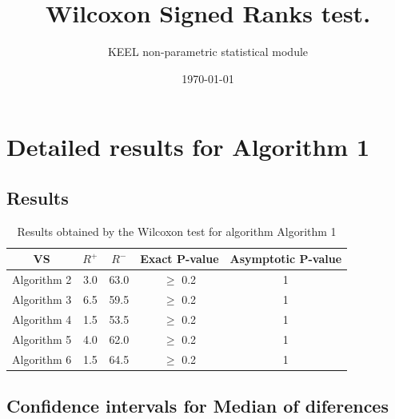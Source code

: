 \documentclass[a4paper,10pt]{article}
\title{Wilcoxon Signed Ranks test.}
\date{\today}
\author{KEEL non-parametric statistical module}
\begin{document}
\pagestyle{empty}
\maketitle
\thispagestyle{empty}



\section{Detailed results for Algorithm 1}


\subsection{Results}

\begin{table}[!htp]
\centering\small
\begin{tabular}{
|c|c|c|c|c|}
\hline
 VS & $R^{+}$ & $R^{-}$ & Exact P-value & Asymptotic P-value \\ \hline 
Algorithm 2 & 3.0 & 63.0 & $\geq$ 0.2 & 1\\ \hline 
Algorithm 3 & 6.5 & 59.5 & $\geq$ 0.2 & 1\\ \hline 
Algorithm 4 & 1.5 & 53.5 & $\geq$ 0.2 & 1\\ \hline 
Algorithm 5 & 4.0 & 62.0 & $\geq$ 0.2 & 1\\ \hline 
Algorithm 6 & 1.5 & 64.5 & $\geq$ 0.2 & 1\\ \hline 

\end{tabular}
\caption{Results obtained by the Wilcoxon test for algorithm Algorithm 1}
\end{table}

\subsection{Confidence intervals for Median of diferences}
\end{document}
